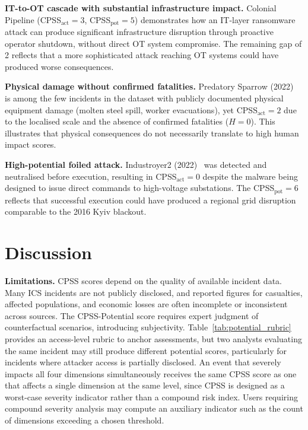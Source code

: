 \documentclass[11pt]{article}
\begin{document}
\textbf{IT-to-OT cascade with substantial infrastructure impact.}
Colonial Pipeline (CPSS$_\text{act}=3$, CPSS$_\text{pot}=5$) demonstrates
how an IT-layer ransomware attack can produce significant infrastructure
disruption through proactive operator shutdown, without direct OT system
compromise. The remaining gap of 2 reflects that a more sophisticated
attack reaching OT systems could have produced worse consequences.

\textbf{Physical damage without confirmed fatalities.}
Predatory Sparrow (2022)~\cite{claroty_sparrow} is among the few incidents
in the dataset with publicly documented physical equipment damage
(molten steel spill, worker evacuations), yet CPSS$_\text{act} = 2$
due to the localised scale and the absence of confirmed fatalities ($H = 0$).
This illustrates that physical consequences do not necessarily translate
to high human impact scores.

\textbf{High-potential foiled attack.}
Industroyer2 (2022)~\cite{eset_industroyer2} was detected and neutralised
before execution, resulting in CPSS$_\text{act} = 0$ despite the malware
being designed to issue direct commands to high-voltage substations.
The CPSS$_\text{pot} = 6$ reflects that successful execution could have
produced a regional grid disruption comparable to the 2016 Kyiv blackout.

\section{Discussion}
\label{sec:discussion}

\textbf{Limitations.}
CPSS scores depend on the quality of available incident data.
Many ICS incidents are not publicly disclosed, and reported figures
for casualties, affected populations, and economic losses are often
incomplete or inconsistent across sources.
The CPSS-Potential score requires expert judgment of counterfactual
scenarios, introducing subjectivity.
Table~\ref{tab:potential_rubric} provides an access-level rubric
to anchor assessments, but two analysts evaluating the same incident
may still produce different potential scores,
particularly for incidents where attacker access is partially disclosed.
An event that severely impacts all four dimensions simultaneously
receives the same CPSS score as one that affects a single dimension
at the same level, since CPSS is designed as a worst-case severity
indicator rather than a compound risk index.
Users requiring compound severity analysis may compute an auxiliary indicator
such as the count of dimensions exceeding a chosen threshold.
\end{document}

